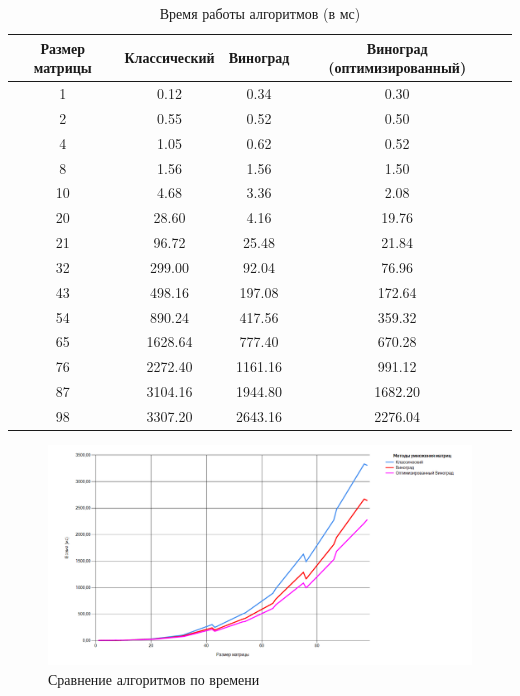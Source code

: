 \begin{table}[h]
	\begin{center}
		\begin{threeparttable}
		\captionsetup{justification=raggedright,singlelinecheck=off}
		\caption{Время работы алгоритмов (в мс)}
		\label{tbl:time_measurements}
		\begin{tabular}{|c|c|c|c|c|}
			\hline
			Размер матрицы &  Классический & Виноград & Виноград (оптимизированный) \\
            \hline
			1    & 0.12 & 0.34 & 0.30 \\
            \hline
			2    & 0.55 & 0.52 & 0.50 \\ 
            \hline
			4    & 1.05 & 0.62 & 0.52 \\ 
            \hline
			8    & 1.56 & 1.56 & 1.50 \\ 
			\hline
			10    & 4.68 & 3.36 & 2.08 \\ 
			\hline
			20    & 28.60 & 4.16 & 19.76 \\ 
			\hline
			21    & 96.72 & 25.48 & 21.84 \\ 
			\hline
			32    & 299.00 & 92.04 & 76.96 \\ 
			\hline
			43    & 498.16 & 197.08 & 172.64 \\ 
			\hline
			54    & 890.24 & 417.56 & 359.32 \\ 
			\hline
			65    & 1628.64 & 777.40 & 670.28 \\ 
			\hline
            76    & 2272.40 & 1161.16 & 991.12 \\ 
            \hline
            87    & 3104.16 & 1944.80 & 1682.20 \\ 
            \hline
            98   & 3307.20 & 2643.16 & 2276.04 \\ 
            \hline
		\end{tabular}
		\end{threeparttable}
    \end{center}
\end{table}

\begin{figure}[H]
    \centering
    \includegraphics[width=1\linewidth]{img/graph.png}
    \caption{Сравнение алгоритмов по времени}
    \label{fig:tm}
\end{figure}

